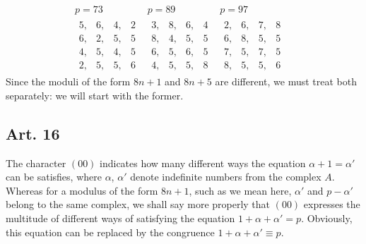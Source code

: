 \documentclass{book}
\theoremstyle{plain}
\theoremstyle{remark}
\begin{document}
\[\begin{array}{c|c|c|c}
p=73 & p=89 & p=97 & \\
\begin{array}{llll} 5,&6,&4,&2\\6,&2,&5,&5\\4,&5,&4,&5\\2,&5,&5,&6 \end{array} &
\begin{array}{llll} 3,&8,&6,&4\\8,&4,&5,&5\\6,&5,&6,&5\\4,&5,&5,&8 \end{array}&
\begin{array}{llll} 2,&6,&7,&8\\6,&8,&5,&5\\7,&5,&7,&5\\8,&5,&5,&6 \end{array} &
 \end{array} \]
Since the moduli of the form $8n+1$ and $8n+5$ are different, we must treat both separately: we will start with the former.

\subsection*{Art. 16} 

The character $(00)$ indicates how many different ways the equation $\alpha +1 = \alpha'$ can be satisfies, where $\alpha$, $\alpha'$ denote indefinite numbers from the complex $A$.  Whereas for a modulus of the form $8n+1$, such as we mean here, $\alpha'$ and $p-\alpha'$ belong to the same complex, we shall say more properly that $(00)$ expresses the multitude of different ways of satisfying the equation $1 + \alpha + \alpha' = p$.  Obviously, this equation can be replaced by the congruence $1 + \alpha + \alpha' \equiv p$.  
\end{document}

